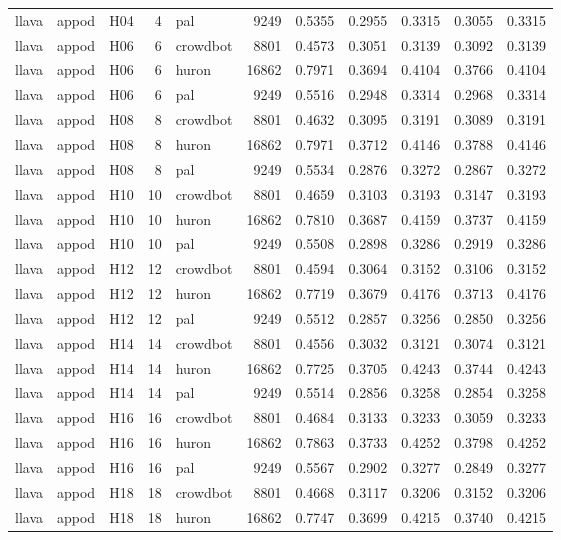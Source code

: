 \begin{table}[tbp]
\begin{tabular}{lllrlrrrrrr}
llava & appod & H04 & 4 & pal & 9249 & 0.5355 & 0.2955 & 0.3315 & 0.3055 & 0.3315 \\
llava & appod & H06 & 6 & crowdbot & 8801 & 0.4573 & 0.3051 & 0.3139 & 0.3092 & 0.3139 \\
llava & appod & H06 & 6 & huron & 16862 & 0.7971 & 0.3694 & 0.4104 & 0.3766 & 0.4104 \\
llava & appod & H06 & 6 & pal & 9249 & 0.5516 & 0.2948 & 0.3314 & 0.2968 & 0.3314 \\
llava & appod & H08 & 8 & crowdbot & 8801 & 0.4632 & 0.3095 & 0.3191 & 0.3089 & 0.3191 \\
llava & appod & H08 & 8 & huron & 16862 & 0.7971 & 0.3712 & 0.4146 & 0.3788 & 0.4146 \\
llava & appod & H08 & 8 & pal & 9249 & 0.5534 & 0.2876 & 0.3272 & 0.2867 & 0.3272 \\
llava & appod & H10 & 10 & crowdbot & 8801 & 0.4659 & 0.3103 & 0.3193 & 0.3147 & 0.3193 \\
llava & appod & H10 & 10 & huron & 16862 & 0.7810 & 0.3687 & 0.4159 & 0.3737 & 0.4159 \\
llava & appod & H10 & 10 & pal & 9249 & 0.5508 & 0.2898 & 0.3286 & 0.2919 & 0.3286 \\
llava & appod & H12 & 12 & crowdbot & 8801 & 0.4594 & 0.3064 & 0.3152 & 0.3106 & 0.3152 \\
llava & appod & H12 & 12 & huron & 16862 & 0.7719 & 0.3679 & 0.4176 & 0.3713 & 0.4176 \\
llava & appod & H12 & 12 & pal & 9249 & 0.5512 & 0.2857 & 0.3256 & 0.2850 & 0.3256 \\
llava & appod & H14 & 14 & crowdbot & 8801 & 0.4556 & 0.3032 & 0.3121 & 0.3074 & 0.3121 \\
llava & appod & H14 & 14 & huron & 16862 & 0.7725 & 0.3705 & 0.4243 & 0.3744 & 0.4243 \\
llava & appod & H14 & 14 & pal & 9249 & 0.5514 & 0.2856 & 0.3258 & 0.2854 & 0.3258 \\
llava & appod & H16 & 16 & crowdbot & 8801 & 0.4684 & 0.3133 & 0.3233 & 0.3059 & 0.3233 \\
llava & appod & H16 & 16 & huron & 16862 & 0.7863 & 0.3733 & 0.4252 & 0.3798 & 0.4252 \\
llava & appod & H16 & 16 & pal & 9249 & 0.5567 & 0.2902 & 0.3277 & 0.2849 & 0.3277 \\
llava & appod & H18 & 18 & crowdbot & 8801 & 0.4668 & 0.3117 & 0.3206 & 0.3152 & 0.3206 \\
llava & appod & H18 & 18 & huron & 16862 & 0.7747 & 0.3699 & 0.4215 & 0.3740 & 0.4215 \\

\end{tabular}
\end{table}
